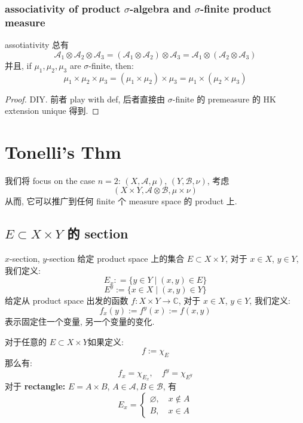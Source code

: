 \documentclass[lang=cn,11pt]{elegantbook}
\begin{document}
\subsection{associativity of product $\sigma$-algebra and $\sigma$-finite product measure}
\begin{corollary}{assotiativity}
总有 $$ \mathcal{A}_1 \otimes \mathcal{A}_2  \otimes \mathcal{A}_3 =  (\mathcal{A}_1 \otimes \mathcal{A}_2)  \otimes \mathcal{A}_3 =   \mathcal{A}_1 \otimes (\mathcal{A}_2  \otimes \mathcal{A}_3 ) $$ 并且, if $\mu_1, \mu_2,\mu_3$ are $\sigma$-finite, then: $$\mu_1 \times \mu_2 \times \mu_3 = (\mu_1 \times \mu_2) \times \mu_3  = \mu_1 \times (\mu_2 \times \mu_3 )$$
\end{corollary}
\begin{proof}
    DIY. 前者 play with def, 后者直接由 $\sigma$-finite 的 premeasure 的 HK extension unique 得到. 
\end{proof}







\chapter{Tonelli's Thm}

 我们将 focus on the case $n=2$: $(X,\mathcal{A}, \mu)$, $(Y, \mathcal{B}, \nu)$, 考虑 \[
 (X \times Y, \mathcal{A} \otimes \mathcal{B}, \mu \times \nu)
 \]
 从而, 它可以推广到任何 finite 个 measure space 的 product 上.

\section{$E\subset X \times Y $ 的 section }
\begin{definition}{$x$-section, $y$-section}
给定 product space 上的集合 $E \subset X \times Y$, 对于 $x \in X$, $y\in Y$, 我们定义:
\[E_x : = \{  y\in Y \mid (x,y) \in E \}\]
\[
E^y := \{x\in X \mid (x,y) \in Y  \}
\]
给定从 product space 出发的函数 $f: X \times Y \to \mathbb{C}$, 对于 $x \in X$, $y\in Y$, 我们定义: \[
f_x (y) := f^y(x) := f(x,y)
\]
表示固定住一个变量, 另一个变量的变化.
\end{definition}

\begin{example}
对于任意的 $E \subset X \times Y$如果定义: \[
    f:= \chi_E
    \]
那么有: \[
f_x = \chi_{E_x},\quad f^y = \chi_{E^y}
\]
对于 \textbf{rectangle:} $E = A \times B $, $A \in \mathcal{A}, B \in \mathcal{B}$, 有 $$E_x = \begin{cases}
        \varnothing ,\quad x\not\in A \\
        B ,\quad x\in A
    \end{cases}$$
\end{example}
\end{document}
